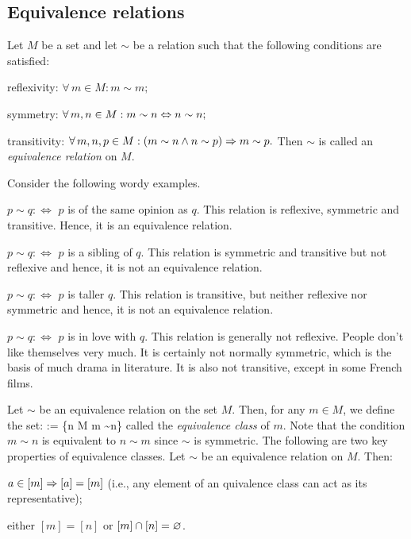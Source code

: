 \subsection{Equivalence relations}

\bd
Let $M$ be a set and let $\sim$ be a relation such that the following conditions are satisfied:
\ben
\item[i)] reflexivity: $\forall \, m \in M: m \sim m;$
\item[ii)] symmetry: $\forall \, m,n \in M: m \sim n \Leftrightarrow n \sim n;$
\item[iii)] transitivity: $\forall \, m,n,p \in M: (m \sim n \land n \sim p) \Rightarrow m \sim p.$
\een
Then $\sim$ is called an \emph{equivalence relation} on $M$.
\ed

\be
Consider the following wordy examples.
\ben[label=\alph*)]
\item $p\sim q :\Leftrightarrow $ $p$ is of the same opinion as $q$. This relation is reflexive, symmetric and transitive. Hence, it is an equivalence relation.
\item $p\sim q :\Leftrightarrow $ $p$ is a sibling of $q$. This relation is symmetric and transitive but not reflexive and hence, it is not an equivalence relation.
\item $p\sim q :\Leftrightarrow $ $p$ is taller $q$. This relation is transitive, but neither reflexive nor symmetric and hence, it is not an equivalence relation.
\item $p\sim q :\Leftrightarrow $ $p$ is in love with $q$. This relation is generally not reflexive. People don't like themselves very much. It is certainly not normally symmetric, which is the basis of much drama in literature. It is also not transitive, except in some French films.
\een
\ee

\bd
Let $\sim$ be an equivalence relation on the set $M$. Then, for any $m \in M$, we define the set:
\bse
[m] := \{n \in M \mid m \sim n\}
\ese
called the \emph{equivalence class} of $m$. Note that the condition $m \sim n$ is equivalent to $n \sim m$ since $\sim$ is symmetric.
\ed
The following are two key properties of equivalence classes.
\bp
Let $\sim$ be an equivalence relation on $M$. Then:
\ben
\item[i)] $a \in [m] \Rightarrow [a]=[m]$ (i.e., any element of an quivalence class
can act as its representative);
\item[ii)] either $[m]=[n]$ or $[m] \cap [n] = \varnothing$.
\een
\ep

